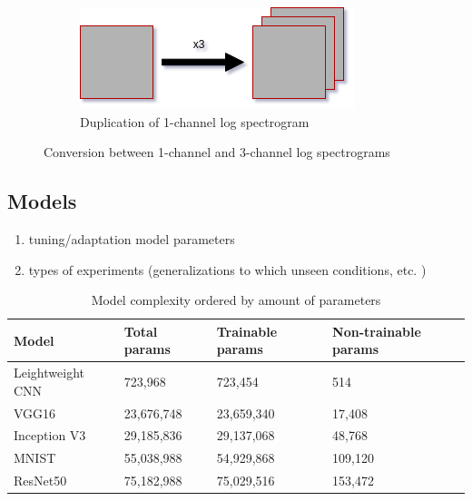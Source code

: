 \documentclass{article}
\theoremstyle{definition}
\theoremstyle{remark}
\begin{document}
\begin{figure}[h!]
\par\bigskip
\begin{subfigure}{.5\textwidth}
  \centering
  \includegraphics[width=1\linewidth]{img/grayscale_multiply.png}
  \caption{Duplication of 1-channel log spectrogram}
  \label{fig:sub2}
\end{subfigure}
\caption{Conversion between 1-channel and 3-channel log spectrograms}
\label{fig:channel_conversion}
\end{figure}





\subsection{Models}


\begin{enumerate}
	\item tuning/adaptation model parameters
	\item types of experiments (generalizations to which unseen conditions, etc. )
\end{enumerate}


\begin{table}[h!]
\center
\begin{tabular}{|l|l|l|l|}
\hline
\textbf{Model} & \textbf{Total params} & \textbf{Trainable params} & \textbf{Non-trainable params} \\ \hline
Leightweight CNN & 723,968 & 723,454 & 514 \\ \hline
VGG16  		& 23,676,748   & 23,659,340        & 17,408 \\ \hline	
Inception V3	& 29,185,836   & 29,137,068  	   & 48,768	 \\ \hline
MNIST			& 55,038,988   & 54,929,868   	   & 109,120  \\ \hline
ResNet50  	& 75,182,988   & 75,029,516 	   & 153,472 \\ \hline	
\end{tabular}
\caption{Model complexity ordered by amount of parameters}
\label{tab:model_complexity}
\end{table}
\end{document}
